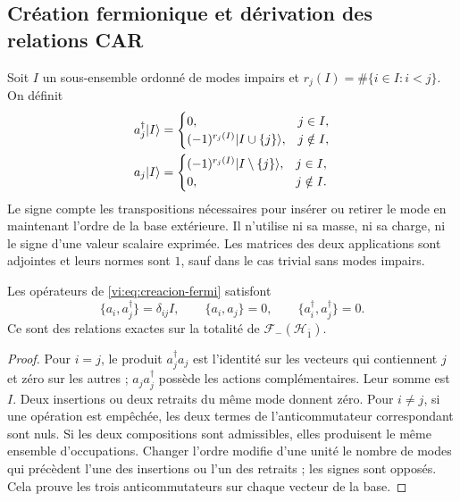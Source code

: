 \subsection{Création fermionique et dérivation des relations CAR}
\label{vi:subsec:car-construccion}

Soit \(I\) un sous-ensemble ordonné de modes impairs et
\(r_j(I)=\#\{i\in I:i<j\}\). On définit
\begin{align}
 a_j^\dagger|I\rangle&=
 \begin{cases}
 0,&j\in I,\\
 (-1)^{r_j(I)}|I\cup\{j\}\rangle,&j\notin I,
 \end{cases}\notag\\
 a_j|I\rangle&=
 \begin{cases}
 (-1)^{r_j(I)}|I\setminus\{j\}\rangle,&j\in I,\\
 0,&j\notin I.
 \end{cases}
 \label{vi:eq:creacion-fermi}
\end{align}
Le signe compte les transpositions nécessaires pour insérer ou retirer
le mode en maintenant l’ordre de la base extérieure. Il n’utilise ni sa masse,
ni sa charge, ni le signe d’une valeur scalaire exprimée. Les matrices des
deux applications sont adjointes et leurs normes sont \(1\), sauf dans le
cas trivial sans modes impairs.

\begin{theorem}
\label{vi:thm:car-construidas}
Les opérateurs de \eqref{vi:eq:creacion-fermi} satisfont
\[
 \{a_i,a_j^\dagger\}=\delta_{ij}I,\qquad
 \{a_i,a_j\}=0,\qquad
 \{a_i^\dagger,a_j^\dagger\}=0.
\]
Ce sont des relations exactes sur la totalité de
\(\mathcal F_-(\mathcal H_{\bar1})\).
\end{theorem}
\begin{proof}
Pour \(i=j\), le produit \(a_j^\dagger a_j\) est l’identité
sur les vecteurs qui contiennent \(j\) et zéro sur les autres ;
\(a_ja_j^\dagger\) possède les actions complémentaires. Leur somme
est \(I\). Deux insertions ou deux retraits du même mode donnent zéro.
Pour \(i\ne j\), si une opération est empêchée, les deux termes
de l’anticommutateur correspondant sont nuls. Si les deux compositions
sont admissibles, elles produisent le même ensemble d’occupations. Changer
l’ordre modifie d’une unité le nombre de modes qui précèdent
l’une des insertions ou l’un des retraits ; les signes sont opposés. Cela
prouve les trois anticommutateurs sur chaque vecteur de la base.
\end{proof}

